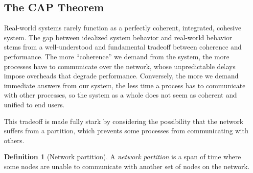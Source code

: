 \documentclass[]             %
{NASA}                       %
\theoremstyle{definition}
\newtheorem{definition}[theorem]{Definition}
\begin{document}

\subsection{The CAP Theorem}
Real-world systems rarely function as a perfectly coherent,
integrated, cohesive system. The gap between idealized system behavior
and real-world behavior stems from a well-understood and fundamental
tradeoff between coherence and performance. The more ``coherence'' we
demand from the system, the more processes have to communicate over
the network, whose unpredictable delays impose overheads that degrade
performance. Conversely, the more we demand immediate answers from our
system, the less time a process has to communicate with other
processes, so the system as a whole does not seem as coherent and
unified to end users.

This tradeoff is made fully stark by considering the possibility that
the network suffers from a partition, which prevents some processes
from communicating with others.

\begin{definition}[Network partition] A \emph{network partition} is a
span of time where some nodes are unable to communicate with another
set of nodes on the network.
\end{definition}
\end{document}
